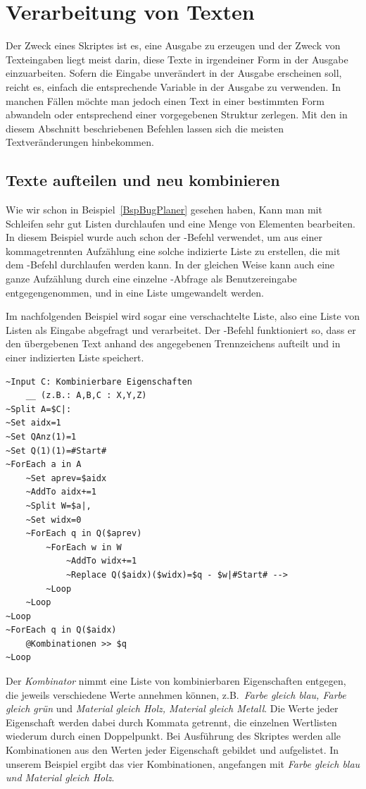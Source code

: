 \chapter{Verarbeitung von Texten}
Der Zweck eines Skriptes ist es, eine Ausgabe zu erzeugen und der Zweck von Texteingaben liegt meist darin, diese Texte in irgendeiner Form in der Ausgabe einzuarbeiten. Sofern die Eingabe unverändert in der Ausgabe erscheinen soll, reicht es, einfach die entsprechende Variable in der Ausgabe zu verwenden. In manchen Fällen möchte man jedoch einen Text in einer bestimmten Form abwandeln oder entsprechend einer vorgegebenen Struktur zerlegen. Mit den in diesem Abschnitt beschriebenen Befehlen lassen sich die meisten Textveränderungen hinbekommen.

\section{Texte aufteilen und neu kombinieren}\label{TexteAufteilen}
Wie wir schon in Beispiel~\ref{BspBugPlaner} gesehen haben, Kann man mit Schleifen sehr gut Listen durchlaufen und eine Menge von Elementen bearbeiten. In diesem Beispiel wurde auch schon der -Befehl verwendet, um aus einer kommagetrennten Aufzählung eine solche indizierte Liste zu erstellen, die mit dem -Befehl durchlaufen werden kann. In der gleichen Weise kann auch eine ganze Aufzählung durch eine einzelne -Abfrage als Benutzereingabe entgegengenommen, und in eine Liste umgewandelt werden. 

Im nachfolgenden Beispiel wird sogar eine verschachtelte Liste, also eine Liste von Listen als Eingabe abgefragt und verarbeitet. Der -Befehl funktioniert so, dass er den übergebenen Text anhand des angegebenen Trennzeichens aufteilt und in einer indizierten Liste speichert. 

\label{BspKombinator}
\begin{verbatim}
~Input C: Kombinierbare Eigenschaften
    __ (z.B.: A,B,C : X,Y,Z)
~Split A=$C|:
~Set aidx=1
~Set QAnz(1)=1
~Set Q(1)(1)=#Start#
~ForEach a in A
    ~Set aprev=$aidx
    ~AddTo aidx+=1
    ~Split W=$a|,
    ~Set widx=0
    ~ForEach q in Q($aprev)
        ~ForEach w in W
            ~AddTo widx+=1
            ~Replace Q($aidx)($widx)=$q - $w|#Start# -->
        ~Loop
    ~Loop
~Loop
~ForEach q in Q($aidx)
    @Kombinationen >> $q
~Loop
\end{verbatim}

Der \emph{Kombinator} nimmt eine Liste von kombinierbaren Eigenschaften entgegen, die jeweils verschiedene Werte annehmen können, z.B.\ \emph{Farbe gleich blau, Farbe gleich grün} und \emph{Material gleich Holz, Material gleich Metall}. Die Werte jeder Eigenschaft werden dabei durch Kommata getrennt, die einzelnen Wertlisten wiederum durch einen Doppelpunkt. Bei Ausführung des Skriptes werden alle Kombinationen aus den Werten jeder Eigenschaft gebildet und aufgelistet. In unserem Beispiel ergibt das vier Kombinationen, angefangen mit \emph{Farbe gleich blau und Material gleich Holz}.

